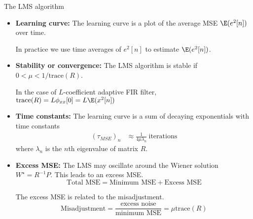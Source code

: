 \documentclass[10pt, aspectratio=169]{beamer}
\begin{document}
\begin{frame}{The LMS algorithm}
\begin{itemize}
	\item \textbf{Learning curve:} The learning curve is a plot of the average MSE $\E(e^2[n])$ over time. 
	
	In practice we use time averages of $e^2[n]$ to estimate $\E(e^2[n])$.
	
	\item \textbf{Stability or convergence:} The LMS algorithm is stable if $0 < \mu < 1/\mathrm{trace}(R)$.
	
	In the case of $L$-coefficient adaptive FIR filter, $\mathrm{trace}(R) = L\phi_{xx}[0] = L\E(x^2[n])$
	
	\item \textbf{Time constants:} The learning curve is a sum of decaying exponentials with time constants 
	\begin{align*}
	(\tau_{MSE})_n &\approx \frac{1}{4\mu\lambda_n}~\text{iterations} \tag{Steepest descent \& LMS} 
	\end{align*}
	where $\lambda_n$ is the $n$th eigenvalue of matrix $R$.	
	
	\item \textbf{Excess MSE:} The LMS may oscillate around the Wiener solution $W^\star = R^{-1}P$. This leads to an excess MSE.
	\begin{equation*}
		\text{Total MSE} = \text{Minimum MSE} + \text{Excess MSE}
	\end{equation*}
	
	The excess MSE is related to the misadjustment. 
	\begin{equation}
	\text{Misadjustment} = \frac{\text{excess noise}}{\text{minimum MSE}} = \mu\mathrm{trace}(R) \tag{definition}
	\end{equation}
\end{itemize}
\end{frame}
\end{document}
